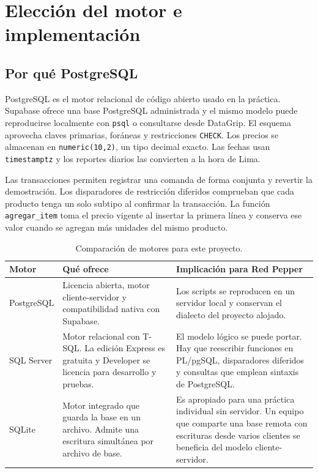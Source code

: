 \documentclass[12pt,a4paper]{article}
\newcommand{\campo}[1]{\texttt{#1}}
\begin{document}
\clearpage
\section{Elección del motor e implementación}

\subsection{Por qué PostgreSQL}
PostgreSQL es el motor relacional de código abierto usado en la práctica. Supabase ofrece una base PostgreSQL administrada y el mismo modelo puede reproducirse localmente con \campo{psql} o consultarse desde DataGrip. El esquema aprovecha claves primarias, foráneas y restricciones \campo{CHECK}. Los precios se almacenan en \campo{numeric(10,2)}, un tipo decimal exacto. Las fechas usan \campo{timestamptz} y los reportes diarios las convierten a la hora de Lima.

Las transacciones permiten registrar una comanda de forma conjunta y revertir la demostración. Los disparadores de restricción diferidos comprueban que cada producto tenga un solo subtipo al confirmar la transacción. La función \campo{agregar\_item} toma el precio vigente al insertar la primera línea y conserva ese valor cuando se agregan más unidades del mismo producto.

\begin{table}[ht]
\caption{Comparación de motores para este proyecto.}
\begin{tabularx}{\linewidth}{@{}p{27mm}YY@{}}
\toprule
\textbf{Motor} & \textbf{Qué ofrece} & \textbf{Implicación para Red Pepper}\\
\midrule
PostgreSQL & Licencia abierta, motor cliente-servidor y compatibilidad nativa con Supabase. & Los scripts se reproducen en un servidor local y conservan el dialecto del proyecto alojado.\\
\addlinespace
SQL Server & Motor relacional con T-SQL. La edición Express es gratuita y Developer se licencia para desarrollo y pruebas. & El modelo lógico se puede portar. Hay que reescribir funciones en PL/pgSQL, disparadores diferidos y consultas que emplean sintaxis de PostgreSQL.\\
\addlinespace
SQLite & Motor integrado que guarda la base en un archivo. Admite una escritura simultánea por archivo de base. & Es apropiado para una práctica individual sin servidor. Un equipo que comparte una base remota con escrituras desde varios clientes se beneficia del modelo cliente-servidor.\\
\bottomrule
\end{tabularx}
\end{table}
\end{document}
